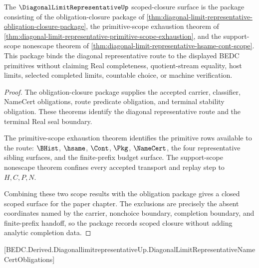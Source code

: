 \begin{theorem}
\label{thm:diagonal-limit-representative-scoped-closure-package}
The $\DiagonalLimitRepresentativeUp$ scoped-closure surface is the package consisting of the obligation-closure package of \autoref{thm:diagonal-limit-representative-obligation-closure-package}, the primitive-scope exhaustion theorem of \autoref{thm:diagonal-limit-representative-primitive-scope-exhaustion}, and the support-scope nonescape theorem of \autoref{thm:diagonal-limit-representative-hsame-cont-scope}. This package binds the diagonal representative route to the displayed BEDC primitives without claiming Real completeness, quotient-stream equality, host limits, selected completed limits, countable choice, or machine verification.
\end{theorem}
\begin{proof}
The obligation-closure package supplies the accepted carrier, classifier, NameCert obligations, route predicate obligation, and terminal stability obligation. These theorems identify the diagonal representative route and the terminal Real seal boundary.

The primitive-scope exhaustion theorem identifies the primitive rows available to the route: $\BHist$, $\hsame$, $\Cont$, $\Pkg$, $\NameCert$, the four representative sibling surfaces, and the finite-prefix budget surface. The support-scope nonescape theorem confines every accepted transport and replay step to $H,C,P,N$.

Combining these two scope results with the obligation package gives a closed scoped surface for the paper chapter. The exclusions are precisely the absent coordinates named by the carrier, nonchoice boundary, completion boundary, and finite-prefix handoff, so the package records scoped closure without adding analytic completion data.
\end{proof}

[BEDC.Derived.DiagonallimitrepresentativeUp.DiagonalLimitRepresentativeNameCertObligations]

